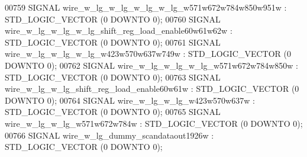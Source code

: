 \begin{DoxyCode}
{00759      \textcolor{keywordflow}{SIGNAL}  \textcolor{vhdlchar}{wire_w_lg_w_lg_w_lg_w_lg_w571w672w784w850w951w} \textcolor{vhdlchar}{:}   \textcolor{comment}{STD\_LOGIC\_VECTOR} \textcolor{vhdlchar}{(}\textcolor{vhdllogic}{}\textcolor{vhdllogic}{0} \textcolor{keywordflow}{DOWNTO} \textcolor{vhdllogic}{}\textcolor{vhdllogic}{0}\textcolor{vhdlchar}{)};
00760      \textcolor{keywordflow}{SIGNAL}  \textcolor{vhdlchar}{wire_w_lg_w_lg_w_lg_shift_reg_load_enable60w61w62w} \textcolor{vhdlchar}{:}   \textcolor{comment}{STD\_LOGIC\_VECTOR} \textcolor{vhdlchar}{(}\textcolor{vhdllogic}{}\textcolor{vhdllogic}{0} \textcolor{keywordflow}{DOWNTO} \textcolor{vhdllogic}{}\textcolor{vhdllogic}{0}\textcolor{vhdlchar}{)};
00761      \textcolor{keywordflow}{SIGNAL}  \textcolor{vhdlchar}{wire_w_lg_w_lg_w_lg_w423w570w637w749w}  \textcolor{vhdlchar}{:}   \textcolor{comment}{STD\_LOGIC\_VECTOR} \textcolor{vhdlchar}{(}\textcolor{vhdllogic}{}\textcolor{vhdllogic}{0} \textcolor{keywordflow}{DOWNTO} \textcolor{vhdllogic}{}\textcolor{vhdllogic}{0}\textcolor{vhdlchar}{)};
00762      \textcolor{keywordflow}{SIGNAL}  \textcolor{vhdlchar}{wire_w_lg_w_lg_w_lg_w571w672w784w850w}  \textcolor{vhdlchar}{:}   \textcolor{comment}{STD\_LOGIC\_VECTOR} \textcolor{vhdlchar}{(}\textcolor{vhdllogic}{}\textcolor{vhdllogic}{0} \textcolor{keywordflow}{DOWNTO} \textcolor{vhdllogic}{}\textcolor{vhdllogic}{0}\textcolor{vhdlchar}{)};
00763      \textcolor{keywordflow}{SIGNAL}  \textcolor{vhdlchar}{wire_w_lg_w_lg_shift_reg_load_enable60w61w} \textcolor{vhdlchar}{:}   \textcolor{comment}{STD\_LOGIC\_VECTOR} \textcolor{vhdlchar}{(}\textcolor{vhdllogic}{}\textcolor{vhdllogic}{0} \textcolor{keywordflow}{DOWNTO} \textcolor{vhdllogic}{}\textcolor{vhdllogic}{0}\textcolor{vhdlchar}{)};
00764      \textcolor{keywordflow}{SIGNAL}  \textcolor{vhdlchar}{wire_w_lg_w_lg_w423w570w637w}   \textcolor{vhdlchar}{:}   \textcolor{comment}{STD\_LOGIC\_VECTOR} \textcolor{vhdlchar}{(}\textcolor{vhdllogic}{}\textcolor{vhdllogic}{0} \textcolor{keywordflow}{DOWNTO} \textcolor{vhdllogic}{}\textcolor{vhdllogic}{0}\textcolor{vhdlchar}{)};
00765      \textcolor{keywordflow}{SIGNAL}  \textcolor{vhdlchar}{wire_w_lg_w_lg_w571w672w784w}   \textcolor{vhdlchar}{:}   \textcolor{comment}{STD\_LOGIC\_VECTOR} \textcolor{vhdlchar}{(}\textcolor{vhdllogic}{}\textcolor{vhdllogic}{0} \textcolor{keywordflow}{DOWNTO} \textcolor{vhdllogic}{}\textcolor{vhdllogic}{0}\textcolor{vhdlchar}{)};
00766      \textcolor{keywordflow}{SIGNAL}  \textcolor{vhdlchar}{wire_w_lg_dummy_scandataout1926w}   \textcolor{vhdlchar}{:}   \textcolor{comment}{STD\_LOGIC\_VECTOR} \textcolor{vhdlchar}{(}\textcolor{vhdllogic}{}\textcolor{vhdllogic}{0} \textcolor{keywordflow}{DOWNTO} \textcolor{vhdllogic}{}\textcolor{vhdllogic}{0}\textcolor{vhdlchar}{)};
}
\end{DoxyCode}
